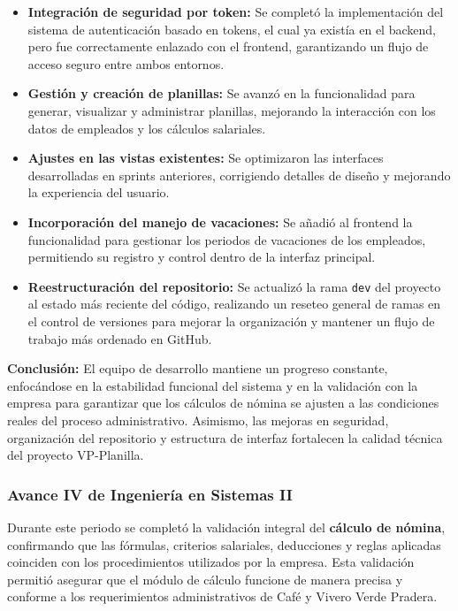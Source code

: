 \begin{itemize}
	\item \textbf{Integración de seguridad por token:} Se completó la implementación del sistema de autenticación basado en tokens, el cual ya existía en el backend, pero fue correctamente enlazado con el frontend, garantizando un flujo de acceso seguro entre ambos entornos.
	\item \textbf{Gestión y creación de planillas:} Se avanzó en la funcionalidad para generar, visualizar y administrar planillas, mejorando la interacción con los datos de empleados y los cálculos salariales.
	\item \textbf{Ajustes en las vistas existentes:} Se optimizaron las interfaces desarrolladas en sprints anteriores, corrigiendo detalles de diseño y mejorando la experiencia del usuario.
	\item \textbf{Incorporación del manejo de vacaciones:} Se añadió al frontend la funcionalidad para gestionar los periodos de vacaciones de los empleados, permitiendo su registro y control dentro de la interfaz principal.
	\item \textbf{Reestructuración del repositorio:} Se actualizó la rama \texttt{dev} del proyecto al estado más reciente del código, realizando un reseteo general de ramas en el control de versiones para mejorar la organización y mantener un flujo de trabajo más ordenado en GitHub.
\end{itemize}

\textbf{Conclusión:}
El equipo de desarrollo mantiene un progreso constante, enfocándose en la estabilidad funcional del sistema y en la validación con la empresa para garantizar que los cálculos de nómina se ajusten a las condiciones reales del proceso administrativo. Asimismo, las mejoras en seguridad, organización del repositorio y estructura de interfaz fortalecen la calidad técnica del proyecto VP-Planilla.

\subsubsection{Avance IV de Ingeniería en Sistemas II}

Durante este periodo se completó la validación integral del \textbf{cálculo de nómina}, confirmando que las fórmulas, criterios salariales, deducciones y reglas aplicadas coinciden con los procedimientos utilizados por la empresa. Esta validación permitió asegurar que el módulo de cálculo funcione de manera precisa y conforme a los requerimientos administrativos de Café y Vivero Verde Pradera.

